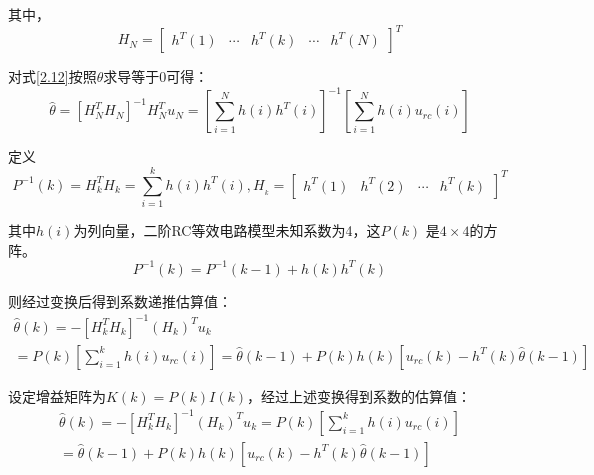 其中，
\begin{equation}
{H_N} = {\left[ {\begin{array}{*{20}{c}}
{{h^T}(1)}& \cdots &{{h^T}(k)}& \cdots &{{h^T}(N)}
\end{array}} \right]^T}
\end{equation}

对式\ref{2.12}按照$\theta$求导等于0可得：
\begin{equation}
\widehat \theta  = {\left[ {H_N^T{H_N}} \right]^{ - 1}}H_N^T{u_N} = {\left[ {\sum\limits_{i = 1}^N {h(i){h^T}(i)} } \right]^{ - 1}}\left[ {\sum\limits_{i = 1}^N {h(i){u_{rc}}(i)} } \right]
\end{equation}

定义
\begin{equation}
{P^{ - 1}}(k) = H_k^T{H_k} = {\sum\limits_{i = 1}^k {h(i){h^T}(i),{H_{_k}} = \left[ {\begin{array}{*{20}{c}}
{{h^T}(1)}&{{h^T}(2)}& \cdots &{{h^T}(k)}
\end{array}} \right]} ^T}
\end{equation}

其中$h\left( i \right)$为列向量，二阶RC等效电路模型未知系数为4，这$P\left( k \right)$ 是$4 \times 4$的方阵。
\begin{equation}
{P^{ - 1}}(k) = {P^{ - 1}}(k - 1) + h(k){h^T}(k)
\end{equation}

则经过变换后得到系数递推估算值：
\begin{equation}
\begin{array}{l}
\widehat \theta (k) =  - {\left[ {H_k^T{H_k}} \right]^{ - 1}}{({H_k})^T}{u_k}\\
 = P(k)\left[ {\sum\limits_{i = 1}^k {h(i){u_{rc}}(i)} } \right] = \widehat \theta (k - 1) + P(k)h(k)\left[ {{u_{rc}}(k) - {h^T}(k)\widehat \theta (k - 1)} \right]
\end{array}
\end{equation}

设定增益矩阵为$K\left( k \right) = P\left( k \right)I\left( k \right)$，经过上述变换得到系数的估算值：
\begin{equation}
\begin{array}{l}
\widehat \theta (k) =  - {\left[ {H_k^T{H_k}} \right]^{ - 1}}{({H_k})^T}{u_k} = P(k)\left[ {\sum\limits_{i = 1}^k {h(i){u_{rc}}(i)} } \right]\\
 = \widehat \theta (k - 1) + P(k)h(k)\left[ {{u_{rc}}(k) - {h^T}(k)\widehat \theta (k - 1)} \right]
\end{array}
\end{equation}

